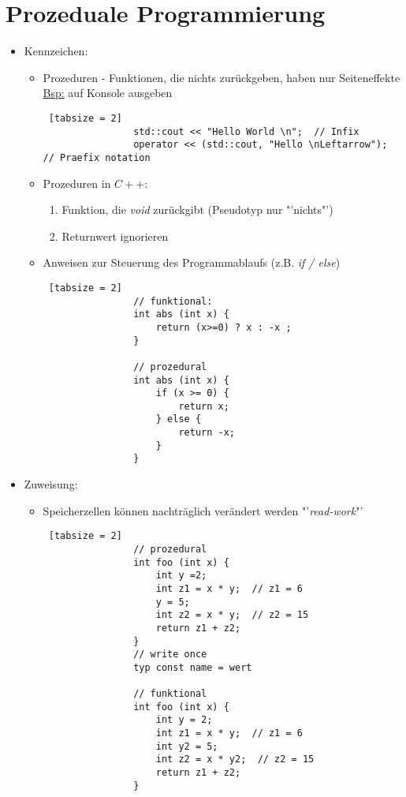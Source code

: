 \documentclass{article}
\begin{document}
	 	
	 	\section{Prozeduale Programmierung}
 	
 	\begin{itemize}
 		\item Kennzeichen:
 		\begin{itemize}
 			\item Prozeduren - Funktionen, die nichts zurückgeben, haben nur Seiteneffekte \\ \underline{Bsp:} auf Konsole ausgeben
 			\begin{lstlisting} [tabsize = 2]
 				std::cout << "Hello World \n";  // Infix
 				operator << (std::cout, "Hello \nLeftarrow"); // Praefix notation
 			\end{lstlisting}
 			\item Prozeduren in $C++$:
 			\begin{enumerate}
 				\item Funktion, die \textit{void} zurückgibt (Pseudotyp nur "'nichts"')
 				\item Returnwert ignorieren
 			\end{enumerate}
 			\item Anweisen zur Steuerung des Programmablaufs (z.B. \textit{if / else})
 			\begin{lstlisting} [tabsize = 2]
	 			// funktional:
	 			int abs (int x) {
		 			return (x>=0) ? x : -x ;
	 			}
	 			
	 			// prozedural
	 			int abs (int x) {
		 			if (x >= 0) {
			 			return x;
		 			} else {
			 			return -x;
		 			}
	 			}
 			\end{lstlisting}
 		\end{itemize}
 		\item Zuweisung:
 		\begin{itemize}
 			\item Speicherzellen können nachträglich verändert werden "'\textit{read-work}"'
 			\begin{lstlisting} [tabsize = 2]
	 			// prozedural
 				int foo (int x) {
	 				int y =2;
	 				int z1 = x * y;  // z1 = 6
	 				y = 5;
	 				int z2 = x * y;  // z2 = 15
	 				return z1 + z2;
 				}
 				// write once
 				typ const name = wert
 				
 				// funktional 
 				int foo (int x) {
	 				int y = 2;
	 				int z1 = x * y;  // z1 = 6
	 				int y2 = 5;
	 				int z2 = x * y2;  // z2 = 15
	 				return z1 + z2;
 				}


\end{lstlisting}
\end{itemize}
\end{itemize}
\end{document}
